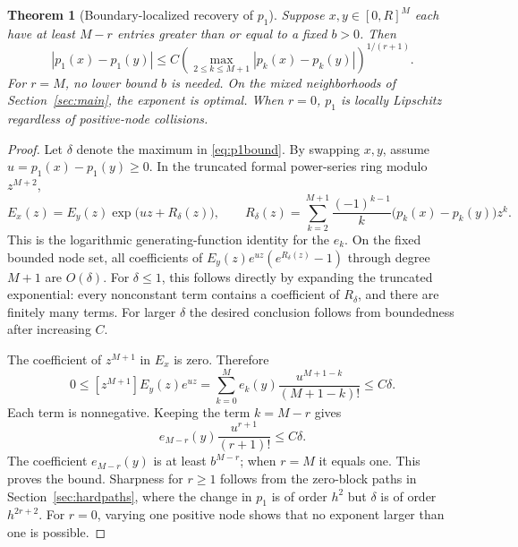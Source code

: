 \documentclass[11pt,a4paper]{article}
\numberwithin{equation}{section}
\newtheorem{theorem}{Theorem}[section]
\theoremstyle{definition}
\theoremstyle{remark}
\begin{document}
\begin{theorem}[Boundary-localized recovery of $p_1$]
\label{thm:p1}
Suppose $x,y\in[0,R]^M$ each have at least $M-r$ entries greater than or equal
to a fixed $b>0$. Then
\begin{equation}
 |p_1(x)-p_1(y)|\le C\left(\max_{2\le k\le M+1}|p_k(x)-p_k(y)|\right)^{1/(r+1)}.
 \label{eq:p1bound}
\end{equation}
For $r=M$, no lower bound $b$ is needed. On the mixed neighborhoods of
Section~\ref{sec:main}, the exponent is optimal. When $r=0$, $p_1$ is locally
Lipschitz regardless of positive-node collisions.
\end{theorem}
\begin{proof}
Let $\delta$ denote the maximum in \eqref{eq:p1bound}. By swapping $x,y$,
assume $u=p_1(x)-p_1(y)\ge0$. In the truncated formal power-series ring modulo
$z^{M+2}$,
\begin{equation}
 E_x(z)=E_y(z)\exp\bigl(uz+R_\delta(z)\bigr),\qquad
 R_\delta(z)=\sum_{k=2}^{M+1}\frac{(-1)^{k-1}}{k}
                 \bigl(p_k(x)-p_k(y)\bigr)z^k.
 \label{eq:generatingidentity}
\end{equation}
This is the logarithmic generating-function identity for the $e_k$.
On the fixed bounded node set, all coefficients of
$E_y(z)e^{uz}(e^{R_\delta(z)}-1)$ through degree $M+1$ are $O(\delta)$.
For $\delta\le1$, this follows directly by expanding the truncated
exponential: every nonconstant term contains a coefficient of $R_\delta$,
and there are finitely many terms. For larger $\delta$ the desired conclusion
follows from boundedness after increasing $C$.

The coefficient of $z^{M+1}$ in $E_x$ is zero. Therefore
\begin{equation}
 0\le [z^{M+1}]E_y(z)e^{uz}
   =\sum_{k=0}^M e_k(y)\frac{u^{M+1-k}}{(M+1-k)!}
   \le C\delta.
 \label{eq:positivecertificate}
\end{equation}
Each term is nonnegative. Keeping the term $k=M-r$ gives
\begin{equation}
 e_{M-r}(y)\frac{u^{r+1}}{(r+1)!}\le C\delta.
\end{equation}
The coefficient $e_{M-r}(y)$ is at least $b^{M-r}$; when $r=M$ it equals one.
This proves the bound. Sharpness for $r\ge1$ follows from the zero-block
paths in Section~\ref{sec:hardpaths}, where the change in $p_1$ is of order
$h^2$ but $\delta$ is of order $h^{2r+2}$. For $r=0$, varying one positive
node shows that no exponent larger than one is possible.
\end{proof}
\end{document}
